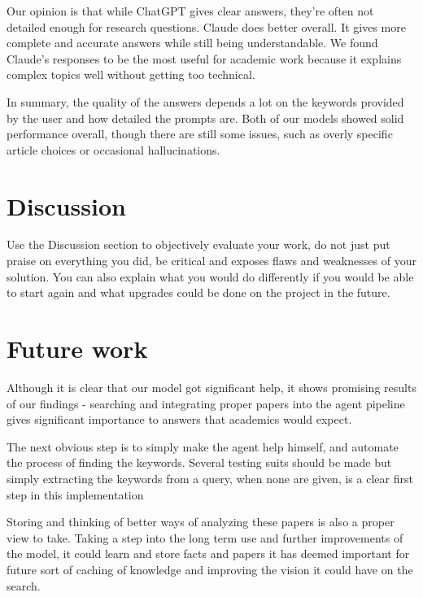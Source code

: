 \documentclass[fleqn,moreauthors,10pt]{ds_report}
\begin{document}
Our opinion is that while ChatGPT gives clear answers, they're often not detailed enough for research questions. Claude does better overall. It gives more complete and accurate answers while still being understandable. We found Claude's responses to be the most useful for academic work because it explains complex topics well without getting too technical.

In summary, the quality of the answers depends a lot on the keywords provided by the user and how detailed the prompts are. Both of our models showed solid performance overall, though there are still some issues, such as overly specific article choices or occasional hallucinations. 



\section*{Discussion}

Use the Discussion section to objectively evaluate your work, do not just put praise on everything you did, be critical and exposes flaws and weaknesses of your solution. You can also explain what you would do differently if you would be able to start again and what upgrades could be done on the project in the future.

\section*{Future work}

Although it is clear that our model got significant help, it shows promising results of our findings - searching and integrating proper papers into the agent pipeline gives significant importance to answers that academics would expect.

The next obvious step is to simply make the agent help himself, and automate the process of finding the keywords. Several testing suits should be made but simply extracting the keywords from a query, when none are given, is a clear first step in this implementation

Storing and thinking of better ways of analyzing these papers is also a proper view to take. Taking a step into the long term use and further improvements of the model, it could learn and store facts and papers it has deemed important for future sort of caching of knowledge and improving the vision it could have on the search.
\end{document}
